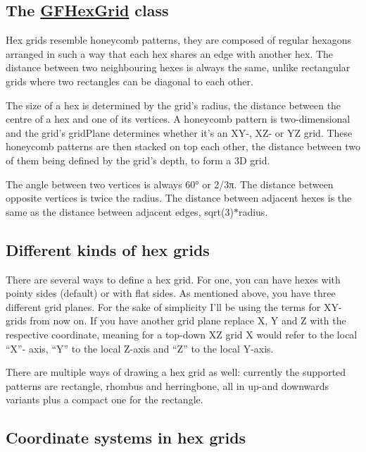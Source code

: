 \subsection*{The \hyperlink{class_g_f_hex_grid}{G\+F\+Hex\+Grid} class }

Hex grids resemble honeycomb patterns, they are composed of regular hexagons arranged in such a way that each hex shares an edge with another hex. The distance between two neighbouring hexes is always the same, unlike rectangular grids where two rectangles can be diagonal to each other.



The size of a hex is determined by the grid’s {\ttfamily radius}, the distance between the centre of a hex and one of its vertices. A honeycomb pattern is two-\/dimensional and the grid’s {\ttfamily grid\+Plane} determines whether it’s an X\+Y-\/, X\+Z-\/ or Y\+Z grid. These honeycomb patterns are then stacked on top each other, the distance between two of them being defined by the grid’s {\ttfamily depth}, to form a 3\+D grid.



The angle between two vertices is always 60° or 2/3π. The distance between opposite vertices is twice the radius. The distance between adjacent hexes is the same as the distance between adjacent edges, {\ttfamily sqrt(3)$\ast$radius}.

\subsection*{Different kinds of hex grids }

There are several ways to define a hex grid. For one, you can have hexes with pointy sides (default) or with flat sides. As mentioned above, you have three different grid planes. For the sake of simplicity I’ll be using the terms for X\+Y-\/grids from now on. If you have another grid plane replace X, Y and Z with the respective coordinate, meaning for a top-\/down X\+Z grid X would refer to the local “\+X”-\/ axis, “\+Y” to the local Z-\/axis and “\+Z” to the local Y-\/axis.



There are multiple ways of drawing a hex grid as well\+: currently the supported patterns are rectangle, rhombus and herringbone, all in up-\/and downwards variants plus a compact one for the rectangle.

\subsection*{Coordinate systems in hex grids }

